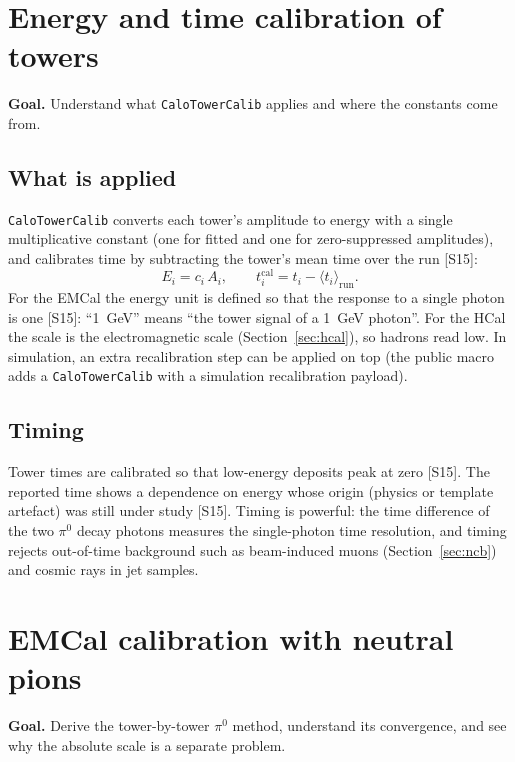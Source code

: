 \documentclass[11pt,letterpaper]{article}
\newcommand{\goal}[1]{\par\noindent\textbf{Goal.} #1\par}
\begin{document}
\section{Energy and time calibration of towers}
\goal{Understand what \texttt{CaloTowerCalib} applies and where the constants come from.}

\subsection{What is applied}
\texttt{CaloTowerCalib} converts each tower's amplitude to energy with a single multiplicative constant (one for fitted and one for zero-suppressed amplitudes),
and calibrates time by subtracting the tower's mean time over the run [S15]:
\begin{equation}
E_i = c_i\,A_i, \qquad t_i^{\mathrm{cal}} = t_i - \langle t_i\rangle_{\mathrm{run}}.
\end{equation}
For the EMCal the energy unit is defined so that the response to a single photon is one [S15]: ``1~GeV'' means ``the tower signal of a 1~GeV photon''.
For the HCal the scale is the electromagnetic scale (Section~\ref{sec:hcal}), so hadrons read low.
In simulation, an extra recalibration step can be applied on top (the public macro adds a \texttt{CaloTowerCalib} with a simulation recalibration payload).

\subsection{Timing}
Tower times are calibrated so that low-energy deposits peak at zero [S15]. The reported time shows a dependence on energy whose origin (physics or template artefact) was still under study [S15].
Timing is powerful: the time difference of the two $\pi^0$ decay photons measures the single-photon time resolution, and timing rejects out-of-time background such as beam-induced muons (Section~\ref{sec:ncb}) and cosmic rays in jet samples.
\section{EMCal calibration with neutral pions}\label{sec:pi0cal}
\goal{Derive the tower-by-tower $\pi^0$ method, understand its convergence, and see why the absolute scale is a separate problem.}
\end{document}
